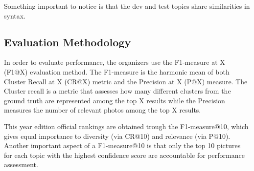     Something important to notice is that the dev and test topics share similarities in syntax. 

        \subsection{Evaluation Methodology}
        \label{sec:eval}

        In order to evaluate performance, the organizers use the F1-measure at X (F1@X) evaluation method. The F1-measure is the harmonic mean of both Cluster Recall at X (CR@X) metric and the Precision at X (P@X) measure. The Cluster recall is a metric that assesses how many different clusters from the ground truth are represented among the top X results  while the Precision measures the number of  relevant photos among the top X results. \cite{Ninh2020}

        This year edition official rankings are obtained trough the F1-measure@10, which gives equal importance to diversity (via CR@10) and relevance (via P@10). Another important aspect of a F1-measure@10 is that only the top 10 pictures for each topic with the highest confidence score are accountable for performance assessment.

